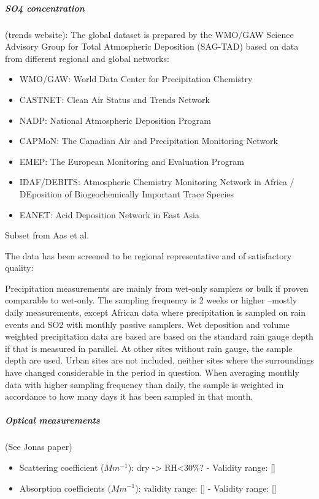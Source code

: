 \documentclass[journal abbreviation, manuscript]{copernicus}
\begin{document}
\subparagraph{SO4 concentration}

(trends website): The global dataset is prepared by the WMO/GAW Science Advisory Group for Total Atmospheric Deposition (SAG-TAD) based on data from different regional and global networks:
\begin{itemize}
 \item WMO/GAW: World Data Center for Precipitation Chemistry
 \item CASTNET: Clean Air Status and Trends Network
 \item NADP: National Atmospheric Deposition Program
 \item CAPMoN: The Canadian Air and Precipitation Monitoring Network
 \item EMEP: The European Monitoring and Evaluation Program
 \item IDAF/DEBITS: Atmospheric Chemistry Monitoring Network in Africa / DEposition of Biogeochemically Important Trace Species
 \item EANET: Acid Deposition Network in East Asia
\end{itemize}

Subset from Aas et al.

The data has been screened to be regional representative and of satisfactory quality:

Precipitation measurements are mainly from wet-only samplers or bulk if proven comparable to wet-only.
The sampling frequency is 2 weeks or higher –mostly daily measurements, except African data where precipitation is sampled on rain events and SO2 with monthly passive samplers.
Wet deposition and volume weighted precipitation data are based are based on the standard rain gauge depth if that is measured in parallel. At other sites without rain gauge, the sample depth are used.
Urban sites are not included, neither sites where the surroundings have changed considerable in the period in question.
When averaging monthly data with higher sampling frequency than daily, the sample is weighted in accordance to how many days it has been sampled in that month.


\subparagraph{Optical measurements}
(See Jonas paper)
\begin{itemize}
 \item Scattering coefficient ($Mm^{-1}$): dry -> RH<30\%? - Validity range: []
 \item Absorption coefficients ($Mm^{-1}$): validity range: [] - Validity range: []
\end{itemize}
\end{document}
